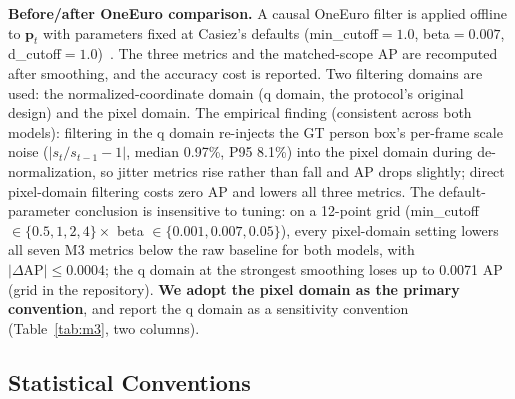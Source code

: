 \documentclass[10pt,conference]{IEEEtran}
\begin{document}
\textbf{Before/after OneEuro comparison.} A causal OneEuro filter is applied offline to $\mathbf{p}_t$ with parameters fixed at Casiez's defaults (min\_cutoff$=1.0$, beta$=0.007$, d\_cutoff$=1.0$)~\cite{13}. The three metrics and the matched-scope AP are recomputed after smoothing, and the accuracy cost is reported. Two filtering domains are used: the normalized-coordinate domain (q domain, the protocol's original design) and the pixel domain. The empirical finding (consistent across both models): filtering in the q domain re-injects the GT person box's per-frame scale noise ($|s_t/s_{t-1}-1|$, median 0.97\%, P95 8.1\%) into the pixel domain during de-normalization, so jitter metrics rise rather than fall and AP drops slightly; direct pixel-domain filtering costs zero AP and lowers all three metrics. The default-parameter conclusion is insensitive to tuning: on a 12-point grid (min\_cutoff $\in\{0.5,1,2,4\}\times$ beta $\in\{0.001,0.007,0.05\}$), every pixel-domain setting lowers all seven M3 metrics below the raw baseline for both models, with $|\Delta\mathrm{AP}|\le 0.0004$; the q domain at the strongest smoothing loses up to 0.0071 AP (grid in the repository). \textbf{We adopt the pixel domain as the primary convention}, and report the q domain as a sensitivity convention (Table~\ref{tab:m3}, two columns).

\subsection{Statistical Conventions}
\end{document}
